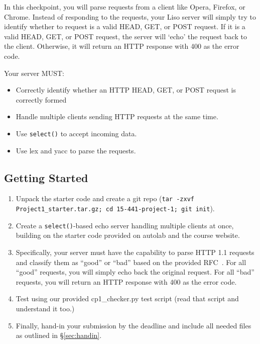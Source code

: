 
In this checkpoint, you will parse requests from a client like Opera, Firefox, or Chrome.
Instead of responding to the requests, your Liso server will simply try to identify whether to request is a valid HEAD, GET, or POST request.
If it is a valid HEAD, GET, or POST request, the server will `echo' the request back to the client.
Otherwise, it will return an HTTP response with 400 as the error code.

\vspace{5pt}

\noindent Your server MUST:
\begin{itemize}
  \item Correctly identify whether an HTTP HEAD, GET, or POST request is correctly formed  \item Handle multiple clients sending HTTP requests at the same time.
  \item Use {\tt select()} to accept incoming data.
  \item Use lex and yacc to parse the requests.
\end{itemize}

\subsection{Getting Started}
\begin{enumerate}
  \item Unpack the starter code and create a git repo (\texttt{tar -zxvf Project1\_starter.tar.gz; cd 15-441-project-1; git init}).

  \item Create a \texttt{select()}-based echo server handling multiple clients at once, building on the  starter code provided on autolab and the course website.  

  \item Specifically, your server must have the capability to parse HTTP 1.1 requests and classify them as ``good'' or ``bad'' based on the provided RFC~\cite{httprfc}. For all ``good'' requests, you will simply echo back the original request. For all ``bad'' requests, you will return an HTTP response with 400 as the error code.

  \item Test using our provided cp1\_checker.py test script (read that script and understand it too.)

  \item Finally, hand-in your
submission by the deadline and include all needed files as outlined in
\S\ref{sec:handin}.\\
\end{enumerate}

